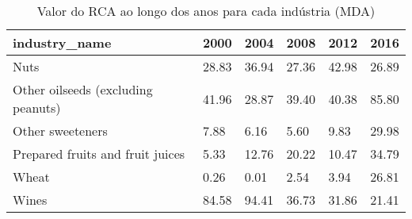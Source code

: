 \begin{table}
\centering
\caption{Valor do RCA ao longo dos anos para cada indústria (MDA)}
\begin{tabular}{p{6cm}p{1.5cm}p{1.5cm}p{1.5cm}p{1.5cm}p{1.5cm}}
\toprule
                     industry\_name &  2000 &  2004 &  2008 &  2012 &  2016 \\
\midrule
                              Nuts & 28.83 & 36.94 & 27.36 & 42.98 & 26.89 \\
Other oilseeds (excluding peanuts) & 41.96 & 28.87 & 39.40 & 40.38 & 85.80 \\
                  Other sweeteners &  7.88 &  6.16 &  5.60 &  9.83 & 29.98 \\
  Prepared fruits and fruit juices &  5.33 & 12.76 & 20.22 & 10.47 & 34.79 \\
                             Wheat &  0.26 &  0.01 &  2.54 &  3.94 & 26.81 \\
                             Wines & 84.58 & 94.41 & 36.73 & 31.86 & 21.41 \\
\bottomrule
\end{tabular}
\end{table}
